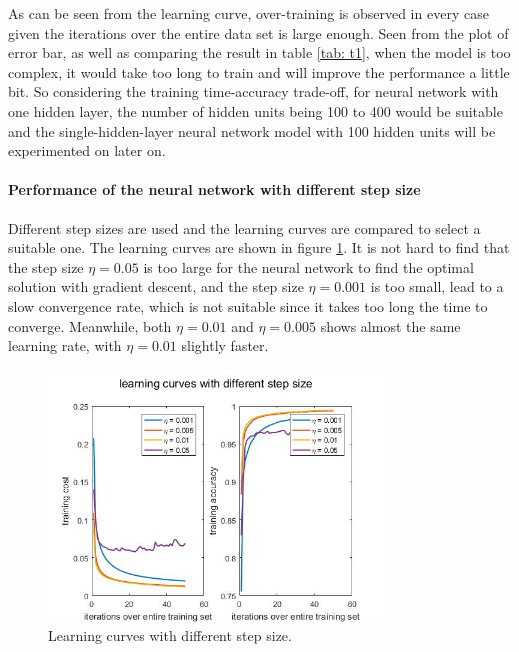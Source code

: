 \documentclass[conference]{IEEEtran}
\begin{document}
As can be seen from the  learning curve, over-training is observed in every case given the iterations over the entire data set is large enough. Seen from the plot of error bar, as well as comparing the result in table \ref{tab: t1}, when the model is too complex, it would take too long to train and will improve the performance a little bit. So considering the training time-accuracy trade-off, for neural network with one hidden layer, the number of hidden units being 100 to 400 would be suitable and the single-hidden-layer neural network model with 100 hidden units will be experimented on later on.

\paragraph{Performance of the neural network with different step size}
Different step sizes are used and the learning curves are compared to select a suitable one. The learning curves are shown in figure \ref{LCSS}. It is not hard to find that the step size $\eta = 0.05$ is too large for the neural network to find the optimal solution with gradient descent, and the step size $\eta = 0.001$ is too small, lead to a slow convergence rate, which is not suitable since it takes too long the time to converge. Meanwhile, both $\eta = 0.01$ and $\eta = 0.005$ shows almost the same learning rate, with $\eta = 0.01$ slightly faster. 
\begin{figure}[h!]
\centerline{\includegraphics[width=3.5in]{noMOMENTUM.jpg}}
\caption{Learning curves with different step size.}
\label{LCSS}
\end{figure}

\end{document}
